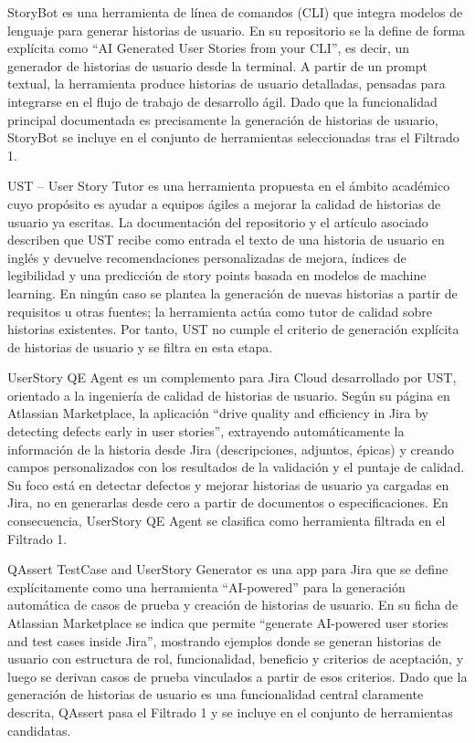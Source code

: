 StoryBot \cite{storybot} es una herramienta de línea de comandos (CLI) que integra modelos de lenguaje para generar historias de usuario. En su repositorio se la define de forma explícita como “AI Generated User Stories from your CLI”, es decir, un generador de historias de usuario desde la terminal. A partir de un prompt textual, la herramienta produce historias de usuario detalladas, pensadas para integrarse en el flujo de trabajo de desarrollo ágil. Dado que la funcionalidad principal documentada es precisamente la generación de historias de usuario, StoryBot se incluye en el conjunto de herramientas seleccionadas tras el Filtrado 1.

UST – User Story Tutor \cite{ust} es una herramienta propuesta en el ámbito académico cuyo propósito es ayudar a equipos ágiles a mejorar la calidad de historias de usuario ya escritas. La documentación del repositorio y el artículo asociado describen que UST recibe como entrada el texto de una historia de usuario en inglés y devuelve recomendaciones personalizadas de mejora, índices de legibilidad y una predicción de story points basada en modelos de machine learning. En ningún caso se plantea la generación de nuevas historias a partir de requisitos u otras fuentes; la herramienta actúa como tutor de calidad sobre historias existentes. Por tanto, UST no cumple el criterio de generación explícita de historias de usuario y se filtra en esta etapa.

UserStory QE Agent \cite{userstoryqe} es un complemento para Jira Cloud desarrollado por UST, orientado a la ingeniería de calidad de historias de usuario. Según su página en Atlassian Marketplace, la aplicación “drive quality and efficiency in Jira by detecting defects early in user stories”, extrayendo automáticamente la información de la historia desde Jira (descripciones, adjuntos, épicas) y creando campos personalizados con los resultados de la validación y el puntaje de calidad. Su foco está en detectar defectos y mejorar historias de usuario ya cargadas en Jira, no en generarlas desde cero a partir de documentos o especificaciones. En consecuencia, UserStory QE Agent se clasifica como herramienta filtrada en el Filtrado 1.

QAssert TestCase and UserStory Generator \cite{qassert} es una app para Jira que se define explícitamente como una herramienta “AI-powered” para la generación automática de casos de prueba y creación de historias de usuario. En su ficha de Atlassian Marketplace se indica que permite “generate AI-powered user stories and test cases inside Jira”, mostrando ejemplos donde se generan historias de usuario con estructura de rol, funcionalidad, beneficio y criterios de aceptación, y luego se derivan casos de prueba vinculados a partir de esos criterios. Dado que la generación de historias de usuario es una funcionalidad central claramente descrita, QAssert pasa el Filtrado 1 y se incluye en el conjunto de herramientas candidatas.


